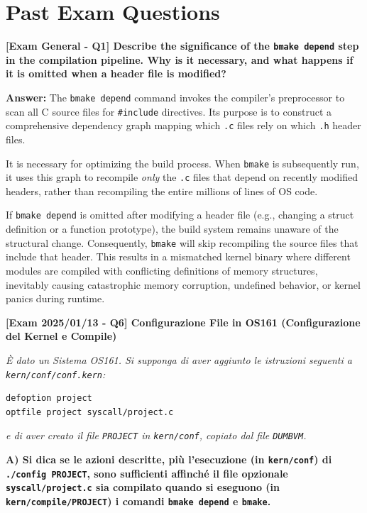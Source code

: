 \section*{Past Exam Questions}

\textbf{[Exam General - Q1] Describe the significance of the \texttt{bmake depend} step in the compilation pipeline. Why is it necessary, and what happens if it is omitted when a header file is modified?}

\textbf{Answer:} 
The \texttt{bmake depend} command invokes the compiler's preprocessor to scan all C source files for \texttt{\#include} directives. Its purpose is to construct a comprehensive dependency graph mapping which \texttt{.c} files rely on which \texttt{.h} header files. 

It is necessary for optimizing the build process. When \texttt{bmake} is subsequently run, it uses this graph to recompile \textit{only} the \texttt{.c} files that depend on recently modified headers, rather than recompiling the entire millions of lines of OS code.

If \texttt{bmake depend} is omitted after modifying a header file (e.g., changing a struct definition or a function prototype), the build system remains unaware of the structural change. Consequently, \texttt{bmake} will skip recompiling the source files that include that header. This results in a mismatched kernel binary where different modules are compiled with conflicting definitions of memory structures, inevitably causing catastrophic memory corruption, undefined behavior, or kernel panics during runtime.

\vspace{1em}

\textbf{[Exam 2025/01/13 - Q6] Configurazione File in OS161 (Configurazione del Kernel e Compile)}

\textit{È dato un Sistema OS161. Si supponga di aver aggiunto le istruzioni seguenti a \texttt{kern/conf/conf.kern}:}
\begin{verbatim}
defoption project
optfile project syscall/project.c
\end{verbatim}
\textit{e di aver creato il file \texttt{PROJECT} in \texttt{kern/conf}, copiato dal file \texttt{DUMBVM}.}

\textbf{A) Si dica se le azioni descritte, più l’esecuzione (in \texttt{kern/conf}) di \texttt{./config PROJECT}, sono sufficienti affinché il file opzionale \texttt{syscall/project.c} sia compilato quando si eseguono (in \texttt{kern/compile/PROJECT}) i comandi \texttt{bmake depend} e \texttt{bmake}.}

